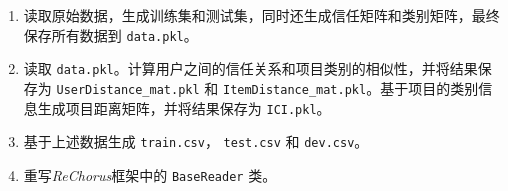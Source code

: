 \documentclass{article}
\begin{document}
\begin{enumerate}
    \item 读取原始数据，生成训练集和测试集，同时还生成信任矩阵和类别矩阵，最终保存所有数据到 \lstinline{data.pkl}。
    \item 读取 \lstinline{data.pkl}。计算用户之间的信任关系和项目类别的相似性，并将结果保存为 \lstinline{UserDistance_mat.pkl} 和 \lstinline{ItemDistance_mat.pkl}。基于项目的类别信息生成项目距离矩阵，并将结果保存为 \lstinline{ICI.pkl}。
    \item 基于上述数据生成 \lstinline{train.csv}， \lstinline{test.csv} 和 \lstinline{dev.csv}。
    \item 重写\emph{ReChorus}框架中的 \lstinline{BaseReader} 类。
\end{enumerate}

\printbibliography
\end{document}
